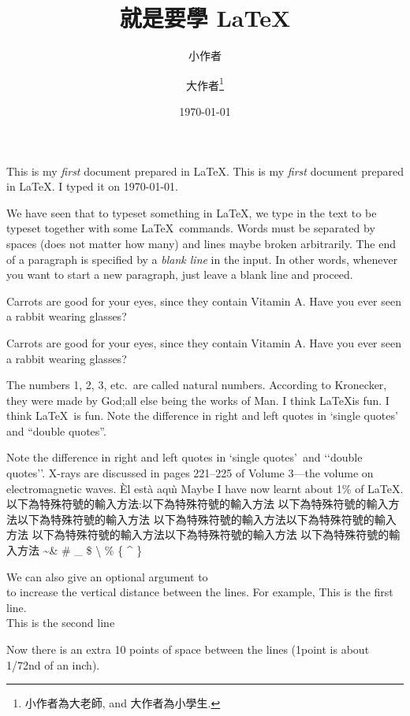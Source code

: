 \documentclass[twocolumn]{article}
\title{就是要學 \LaTeX}
\author{小作者 \and 大作者\footnote{小作者為大老師,
and 大作者為小學生.}}
\date{\today}
\begin{document}
\maketitle
This is my \emph{first} document prepared in \LaTeX.
This is my \emph{first} document prepared in \LaTeX. I typed it on \today.

\noindent We have seen that to typeset something in \LaTeX, we type in the
text to be typeset together with some \LaTeX\ commands.
Words must be separated by spaces (does not matter how many)
and lines maybe broken arbitrarily.
The end of a paragraph is specified by a \emph{blank line}
in the input. In other words, whenever you want to start a new
paragraph, just leave a blank line and proceed.

Carrots are good for your eyes, since they contain Vitamin A\@. Have
you ever seen a rabbit wearing glasses?

Carrots are good for your eyes, since they contain Vitamin A. Have
you ever seen a rabbit wearing glasses?

The numbers 1, 2, 3, etc.\ are called natural numbers. According to
Kronecker, they were made by God;all else being the works of Man.
I think \LaTeX is fun.
I think \LaTeX\ is fun.
Note the difference in right and left quotes in `single quotes'
and ``double quotes''.

Note the difference in right and left quotes in \lq single
quotes\rq\ and \lq\lq double quotes\rq\rq.
X-rays are discussed in pages 221--225 of Volume 3---the volume on
electromagnetic waves.
\`{E}l est\`{a} aqu\`{\i}
Maybe I have now learnt about 1\% of \LaTeX.
以下為特殊符號的輸入方法:以下為特殊符號的輸入方法
以下為特殊符號的輸入方法以下為特殊符號的輸入方法
以下為特殊符號的輸入方法以下為特殊符號的輸入方法
以下為特殊符號的輸入方法以下為特殊符號的輸入方法
以下為特殊符號的輸入方法
\textasciitilde  \&
 \# \_
\$ \textbackslash
 \%  \{
\textasciicircum 
 \}
 
We can also give an optional argument to \\ to increase the vertical distance between the
lines. For example,
This is the first line.\\[10pt]
This is the second line

Now there is an extra 10 points of space between the lines (1point is about 1/72nd of an
inch).
\end{document}
